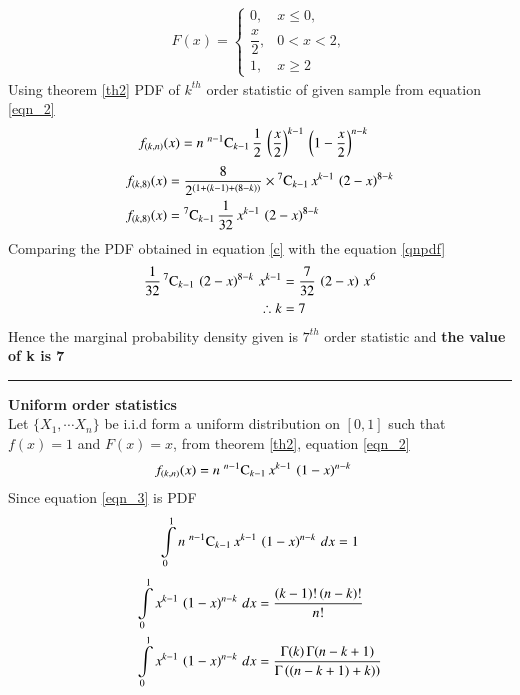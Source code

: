 \documentclass[journal,12pt,twocolumn]{IEEEtran}
\begin{document}
 \begin{align}
 F(x) = 
 \begin{cases}
      0,             &x \leq 0, \\ 
  \dfrac{x}{2},      &0 < x< 2, \\ 
     1,              & x\geq2
 \end{cases} \label{e}
 \end{align}
Using theorem \eqref{th2} PDF of $k^{th}$ order statistic of given sample from equation \eqref{eqn_2}
\begin{align}
f_{(k,n)}(x) &= n\;{}^{n-1}\mathrm{C}_{k-1}\,\dfrac{1}{2}\,\left(\dfrac{x}{2}\right)^{k-1}\,\left(1-\dfrac{x}{2}\right)^{n-k} 
\end{align}
\begin{align}
f_{(k,8)}(x) &= \dfrac{8}{2^{(1+(k-1)+(8-k))}}\times{}^{7}\mathrm{C}_{k-1}\,x^{k-1}\,\left(2-x\right)^{8-k}\\
f_{(k,8)}(x) &= {}^{7}\mathrm{C}_{k-1}\,\dfrac{1}{32}\,x^{k-1}\,\left(2-x\right)^{8-k} \label{c}
 \end{align}
Comparing the PDF obtained in equation \eqref{c} with the equation \eqref{qnpdf}
\begin{align}
\dfrac{1}{32}\,{}^{7}\mathrm{C}_{k-1}\,\left(2-x\right)^{8-k}\,x^{k-1} &= \dfrac{7}{32}\,\left(2-x\right)\,x^6 \\
\therefore k &= 7 
\end{align}
Hence the marginal probability density given is $7^{th}$ order statistic and 
\textbf{the value of k is 7} 
\vspace{0.5cm}
\hrule
\vspace{0.5cm}
\begin{definition}
\label{def2}
\textbf{Uniform order statistics} \\
Let $\{X_1,\cdots X_n\}$ be i.i.d form a uniform distribution on $[0,1]$ such that $f(x) = 1$ and $F(x)=x$,
from theorem \eqref{th2}, equation \eqref{eqn_2}
\begin{align}
f_{(k,n)}(x) &= n\;{}^{n-1}\mathrm{C}_{k-1}\,x^{k-1}\,\left(1-x\right)^{n-k}\label{eqn_3}
\end{align}
Since equation \eqref{eqn_3} is PDF 
\begin{equation}
 \int\limits_{0}^{1} n\;{}^{n-1}\mathrm{C}_{k-1}\,x^{k-1}\,\left(1-x\right)^{n-k} \,dx  = 1    
\end{equation}
\begin{align}
\int\limits_{0}^{1} x^{k-1}\,\left(1-x\right)^{n-k} \,dx  &= \dfrac{(k-1)!\,(n-k)!}{n!}  \\
\int\limits_{0}^{1} x^{k-1}\,\left(1-x\right)^{n-k} \,dx  &= \dfrac{\Gamma(k)\,\Gamma(n-k+1)}{\Gamma\left((n-k+1)+k)\right)} 
\label{beqn}
\end{align}
\label{def3}
\end{definition}
\end{document}
